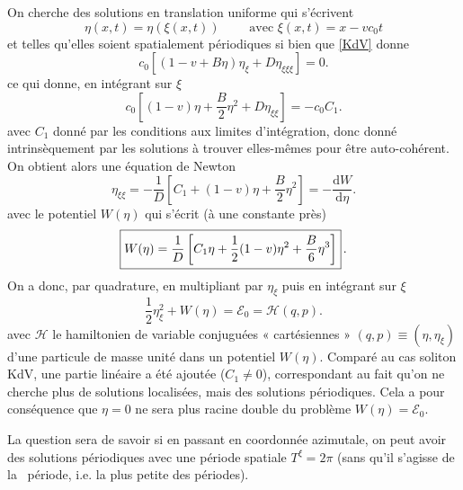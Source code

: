 \documentclass[10pt,a4paper, oneside, fleqn]{myarticle}
\newcommand{\dd}{\mathrm{d}}
\newcommand{\Ecal}{\mathcal{E}}
\newcommand{\Hcal}{\mathcal{H}}
\begin{document}
\medskip

On cherche des solutions en translation uniforme qui s'écrivent
\begin{equation}
  \eta(x,t)=\eta(\xi(x,t)) \qquad\text{ avec } \xi(x,t) = x-vc_0 t
\end{equation}
et telles qu'elles soient spatialement périodiques si bien que \eqref{KdV} donne
\begin{equation}
   c_0\left[ (1-v + B\eta) \eta_\xi + D\eta_{\xi\xi\xi}\right]=0.
\end{equation}
ce qui donne, en intégrant sur $\xi$ 
\begin{equation}
  c_0\left[ (1-v)\eta + \frac B2\eta^2 + D\eta_{\xi\xi}\right]= - c_0 C_1.
\end{equation}
avec $C_1$ donné par les conditions aux limites d'intégration, donc donné intrinsèquement par les solutions à trouver elles-mêmes pour être auto-cohérent. On obtient alors une équation de Newton
\begin{equation}
 \eta_{\xi\xi} = -\frac 1 D \left[ C_1 + (1-v)\eta + \frac B2\eta^2\right] = -\frac{\dd W}{\dd\eta}.
\end{equation}
avec le potentiel $W(\eta)$ qui s'écrit (à une constante près)
\begin{equation}
  \fbox{$W(\eta) = \displaystyle \frac 1 D \left[  C_1 \eta + \frac 12(1-v)\eta^2 + \frac B6\eta^3\right]$}\,. \label{pot_W}
\end{equation}
On a donc, par quadrature, en multipliant par $\eta_\xi$ puis en intégrant sur $\xi$
\begin{equation}
  \frac 1 2\eta_{\xi}^2 + W(\eta) = \Ecal_0 = \Hcal (q,p).
\end{equation}
avec $\Hcal$ le hamiltonien de variable conjuguées « cartésiennes » $(q,p)\equiv(\eta, \eta_\xi)$ d'une particule de masse unité dans un potentiel $W(\eta)$.
Comparé au cas soliton KdV, une partie linéaire a été ajoutée ($C_1\neq 0$), correspondant au fait qu'on ne cherche plus de solutions localisées, mais des solutions périodiques. Cela a pour conséquence que $\eta = 0$ ne sera plus racine double du problème $W(\eta) = \Ecal_0$.

La question sera de savoir si en passant en coordonnée azimutale, on peut avoir des solutions périodiques avec une période spatiale $T^\xi=2\pi$ (sans qu'il s'agisse de \og la \fg\ période, i.e. la plus petite des périodes).



\subsection*{}
\end{document}

